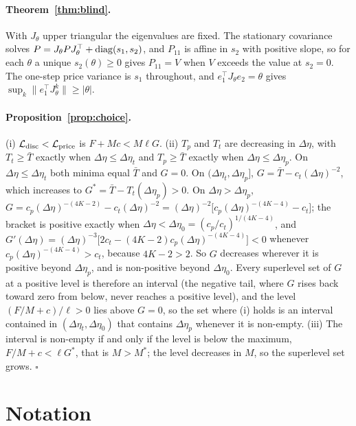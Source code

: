 \documentclass[12pt]{article}
\theoremstyle{definition}
\theoremstyle{remark}
\begin{document}
\paragraph{Theorem~\ref{thm:blind}.} With $J_\theta$ upper triangular the eigenvalues are fixed. The stationary covariance solves $P=J_\theta PJ_\theta^\top+{\rm diag}(s_1,s_2)$, and $P_{11}$ is affine in $s_2$ with positive slope, so for each $\theta$ a unique $s_2(\theta)\ge0$ gives $P_{11}=V$ when $V$ exceeds the value at $s_2=0$. The one-step price variance is $s_1$ throughout, and $e_1^\top J_\theta e_2=\theta$ gives $\sup_k\|e_1^\top J_\theta^k\|\ge|\theta|$.

\paragraph{Proposition~\ref{prop:choice}.} (i) $\mathcal L_{\rm disc}<\mathcal L_{\rm price}$ is $F+Mc<M\ell G$. (ii) $T_p$ and $T_t$ are decreasing in $\Delta\eta$, with $T_t\ge\bar T$ exactly when $\Delta\eta\le\Delta\eta_t$ and $T_p\ge\bar T$ exactly when $\Delta\eta\le\Delta\eta_p$. On $\Delta\eta\le\Delta\eta_t$ both minima equal $\bar T$ and $G=0$. On $(\Delta\eta_t,\Delta\eta_p]$, $G=\bar T-c_t(\Delta\eta)^{-2}$, which increases to $G^*=\bar T-T_t(\Delta\eta_p)>0$. On $\Delta\eta>\Delta\eta_p$, $G=c_p(\Delta\eta)^{-(4K-2)}-c_t(\Delta\eta)^{-2}=(\Delta\eta)^{-2}\bigl[c_p(\Delta\eta)^{-(4K-4)}-c_t\bigr]$; the bracket is positive exactly when $\Delta\eta<\Delta\eta_0=(c_p/c_t)^{1/(4K-4)}$, and $G'(\Delta\eta)=(\Delta\eta)^{-3}\bigl[2c_t-(4K-2)c_p(\Delta\eta)^{-(4K-4)}\bigr]<0$ whenever $c_p(\Delta\eta)^{-(4K-4)}>c_t$, because $4K-2>2$. So $G$ decreases wherever it is positive beyond $\Delta\eta_p$, and is non-positive beyond $\Delta\eta_0$. Every superlevel set of $G$ at a positive level is therefore an interval (the negative tail, where $G$ rises back toward zero from below, never reaches a positive level), and the level $(F/M+c)/\ell>0$ lies above $G=0$, so the set where (i) holds is an interval contained in $(\Delta\eta_t,\Delta\eta_0)$ that contains $\Delta\eta_p$ whenever it is non-empty. (iii) The interval is non-empty if and only if the level is below the maximum, $F/M+c<\ell G^*$, that is $M>M^*$; the level decreases in $M$, so the superlevel set grows. $\square$

\section{Notation}\label{app:notation}
\end{document}
